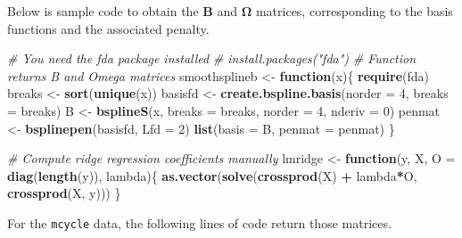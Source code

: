 \documentclass[]{book}
\newenvironment{Shaded}{\begin{snugshade}}{\end{snugshade}}
\newcommand{\CommentTok}[1]{\textcolor[rgb]{0.56,0.35,0.01}{\textit{#1}}}
\newcommand{\ControlFlowTok}[1]{\textcolor[rgb]{0.13,0.29,0.53}{\textbf{#1}}}
\newcommand{\DataTypeTok}[1]{\textcolor[rgb]{0.13,0.29,0.53}{#1}}
\newcommand{\DecValTok}[1]{\textcolor[rgb]{0.00,0.00,0.81}{#1}}
\newcommand{\KeywordTok}[1]{\textcolor[rgb]{0.13,0.29,0.53}{\textbf{#1}}}
\newcommand{\NormalTok}[1]{#1}
\newcommand{\OperatorTok}[1]{\textcolor[rgb]{0.81,0.36,0.00}{\textbf{#1}}}
\newcommand{\StringTok}[1]{\textcolor[rgb]{0.31,0.60,0.02}{#1}}
\theoremstyle{definition}
\theoremstyle{definition}
\theoremstyle{definition}
\theoremstyle{remark}
\begin{document}
Below is sample code to obtain the \(\mathbf{B}\) and
\(\boldsymbol{\Omega}\) matrices, corresponding to the basis functions
and the associated penalty.

\begin{Shaded}
\begin{Highlighting}[]
\CommentTok{# You need the fda package installed}
\CommentTok{# install.packages("fda")}
\CommentTok{# Function returns B and Omega matrices}
\NormalTok{smoothsplineb <-}\StringTok{ }\ControlFlowTok{function}\NormalTok{(x)\{}
  \KeywordTok{require}\NormalTok{(fda)}
\NormalTok{  breaks <-}\StringTok{ }\KeywordTok{sort}\NormalTok{(}\KeywordTok{unique}\NormalTok{(x))}
\NormalTok{  basisfd <-}\StringTok{ }\KeywordTok{create.bspline.basis}\NormalTok{(}\DataTypeTok{norder =} \DecValTok{4}\NormalTok{, }\DataTypeTok{breaks =}\NormalTok{ breaks)}
\NormalTok{  B <-}\StringTok{ }\KeywordTok{bsplineS}\NormalTok{(x, }\DataTypeTok{breaks =}\NormalTok{ breaks, }\DataTypeTok{norder =} \DecValTok{4}\NormalTok{, }\DataTypeTok{nderiv =} \DecValTok{0}\NormalTok{)}
\NormalTok{  penmat <-}\StringTok{ }\KeywordTok{bsplinepen}\NormalTok{(basisfd, }\DataTypeTok{Lfd =} \DecValTok{2}\NormalTok{)}
  \KeywordTok{list}\NormalTok{(}\DataTypeTok{basis =}\NormalTok{ B, }\DataTypeTok{penmat =}\NormalTok{ penmat)}
\NormalTok{\}}

\CommentTok{# Compute ridge regression coefficients manually}
\NormalTok{lmridge <-}\StringTok{ }\ControlFlowTok{function}\NormalTok{(y, X, }\DataTypeTok{O =} \KeywordTok{diag}\NormalTok{(}\KeywordTok{length}\NormalTok{(y)), lambda)\{ }
  \KeywordTok{as.vector}\NormalTok{(}\KeywordTok{solve}\NormalTok{(}\KeywordTok{crossprod}\NormalTok{(X) }\OperatorTok{+}\StringTok{ }\NormalTok{lambda}\OperatorTok{*}\NormalTok{O, }\KeywordTok{crossprod}\NormalTok{(X, y)))}
\NormalTok{\}}
\end{Highlighting}
\end{Shaded}

For the \texttt{mcycle} data, the following lines of code return those
matrices.

\begin{Shaded}
\end{Shaded}
\end{document}
